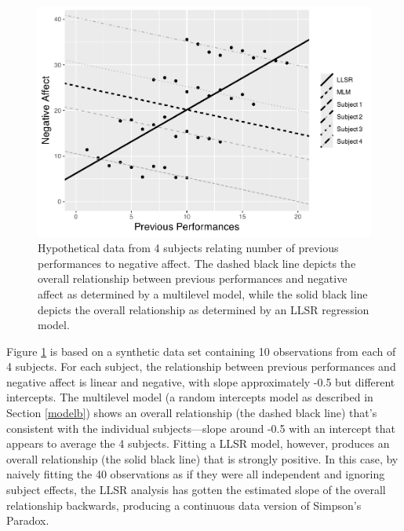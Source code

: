 \documentclass[
]{krantz}
\begin{document}
\begin{figure}

{\centering \includegraphics[width=0.6\linewidth]{bookdown-BeyondMLR_files/figure-latex/mli-spag2-1} 

}

\caption{Hypothetical data from 4 subjects relating number of previous performances to negative affect.  The dashed black line depicts the overall relationship between previous performances and negative affect as determined by a multilevel model, while the solid black line depicts the overall relationship as determined by an LLSR regression model.}\label{fig:mli-spag2}
\end{figure}

Figure \ref{fig:mli-spag2} is based on a synthetic data set containing 10 observations from each of 4 subjects. For each subject, the relationship between previous performances and negative affect is linear and negative, with slope approximately -0.5 but different intercepts. The multilevel model (a random intercepts model as described in Section \ref{modelb}) shows an overall relationship (the dashed black line) that's consistent with the individual subjects---slope around -0.5 with an intercept that appears to average the 4 subjects. Fitting a LLSR model, however, produces an overall relationship (the solid black line) that is strongly positive. In this case, by naively fitting the 40 observations as if they were all independent and ignoring subject effects, the LLSR analysis has gotten the estimated slope of the overall relationship backwards, producing a continuous data version of Simpson's Paradox.
\end{document}
